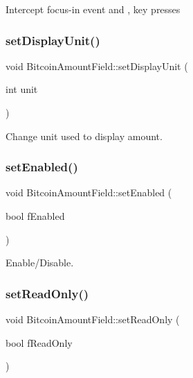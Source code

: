 Intercept focus-\/in event and \textquotesingle{},\textquotesingle{} key presses \mbox{\label{class_bitcoin_amount_field_a623534b2ad508278c5fa8f4c7f363804}} 
\subsubsection{\texorpdfstring{set\+Display\+Unit()}{setDisplayUnit()}}
{\footnotesize\ttfamily void Bitcoin\+Amount\+Field\+::set\+Display\+Unit (\begin{DoxyParamCaption}\item[{int}]{unit }\end{DoxyParamCaption})}

Change unit used to display amount. \mbox{\label{class_bitcoin_amount_field_a0f1bab2b81d298bdc7a3a8c612dbceaa}} 
\subsubsection{\texorpdfstring{set\+Enabled()}{setEnabled()}}
{\footnotesize\ttfamily void Bitcoin\+Amount\+Field\+::set\+Enabled (\begin{DoxyParamCaption}\item[{bool}]{f\+Enabled }\end{DoxyParamCaption})}

Enable/\+Disable. \mbox{\label{class_bitcoin_amount_field_a3762c335f161796bb2ea3208d9ec2efd}} 
\subsubsection{\texorpdfstring{set\+Read\+Only()}{setReadOnly()}}
{\footnotesize\ttfamily void Bitcoin\+Amount\+Field\+::set\+Read\+Only (\begin{DoxyParamCaption}\item[{bool}]{f\+Read\+Only }\end{DoxyParamCaption})}

